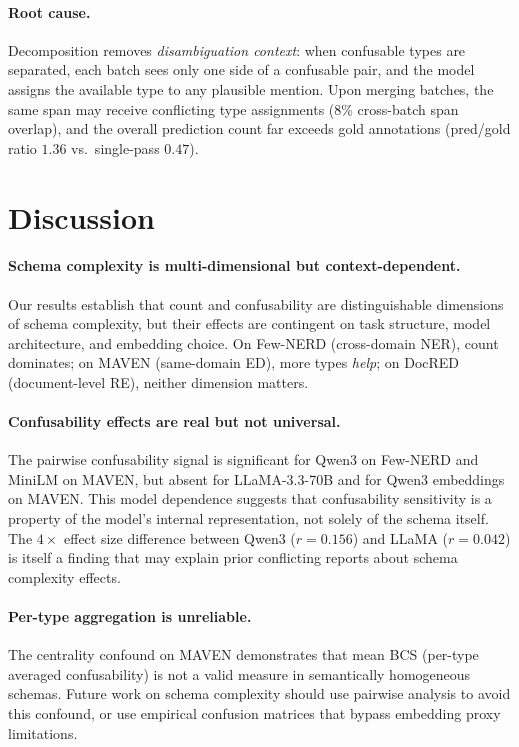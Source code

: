 \documentclass[11pt,a4paper]{article}
\begin{document}
\paragraph{Root cause.}
Decomposition removes \emph{disambiguation context}: when confusable types are separated, each batch sees only one side of a confusable pair, and the model assigns the available type to any plausible mention.
Upon merging batches, the same span may receive conflicting type assignments ($8\%$ cross-batch span overlap), and the overall prediction count far exceeds gold annotations (pred/gold ratio $1.36$ vs.\ single-pass $0.47$).


\section{Discussion}
\label{sec:discussion}

\paragraph{Schema complexity is multi-dimensional but context-dependent.}
Our results establish that count and confusability are distinguishable dimensions of schema complexity, but their effects are contingent on task structure, model architecture, and embedding choice.
On Few-NERD (cross-domain NER), count dominates; on MAVEN (same-domain ED), more types \emph{help}; on DocRED (document-level RE), neither dimension matters.

\paragraph{Confusability effects are real but not universal.}
The pairwise confusability signal is significant for Qwen3 on Few-NERD and MiniLM on MAVEN, but absent for LLaMA-3.3-70B and for Qwen3 embeddings on MAVEN.
This model dependence suggests that confusability sensitivity is a property of the model's internal representation, not solely of the schema itself.
The $4{\times}$ effect size difference between Qwen3 ($r{=}0.156$) and LLaMA ($r{=}0.042$) is itself a finding that may explain prior conflicting reports about schema complexity effects.

\paragraph{Per-type aggregation is unreliable.}
The centrality confound on MAVEN demonstrates that mean BCS (per-type averaged confusability) is not a valid measure in semantically homogeneous schemas.
Future work on schema complexity should use pairwise analysis to avoid this confound, or use empirical confusion matrices that bypass embedding proxy limitations.
\end{document}
